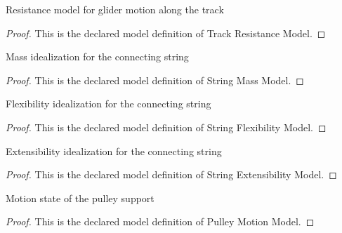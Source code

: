 \begin{definition}
  \label{def:physics:phyx-mini-0805:phyxminiproblems-problemphyxmini0805-trackresistancemodel}
  Resistance model for glider motion along the track
\end{definition}
\begin{proof}
  This is the declared model definition of Track Resistance Model.
\end{proof}
\begin{definition}
  \label{def:physics:phyx-mini-0805:phyxminiproblems-problemphyxmini0805-stringmassmodel}
  Mass idealization for the connecting string
\end{definition}
\begin{proof}
  This is the declared model definition of String Mass Model.
\end{proof}
\begin{definition}
  \label{def:physics:phyx-mini-0805:phyxminiproblems-problemphyxmini0805-stringflexibilitymodel}
  Flexibility idealization for the connecting string
\end{definition}
\begin{proof}
  This is the declared model definition of String Flexibility Model.
\end{proof}
\begin{definition}
  \label{def:physics:phyx-mini-0805:phyxminiproblems-problemphyxmini0805-stringextensibilitymodel}
  Extensibility idealization for the connecting string
\end{definition}
\begin{proof}
  This is the declared model definition of String Extensibility Model.
\end{proof}
\begin{definition}
  \label{def:physics:phyx-mini-0805:phyxminiproblems-problemphyxmini0805-pulleymotionmodel}
  Motion state of the pulley support
\end{definition}
\begin{proof}
  This is the declared model definition of Pulley Motion Model.
\end{proof}
